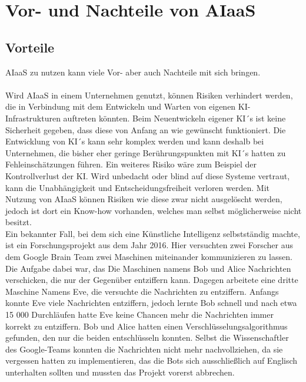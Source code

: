 \section{Vor- und Nachteile von AIaaS}
\subsection{Vorteile}
AIaaS zu nutzen kann viele Vor- aber auch Nachteile mit sich bringen. \\ \\
Wird AIaaS in einem Unternehmen genutzt, können Risiken verhindert werden, die in Verbindung mit dem Entwickeln und Warten von eigenen KI-Infrastrukturen auftreten könnten. Beim Neuentwickeln eigener KI´s ist keine Sicherheit gegeben, dass diese von Anfang an wie gewünscht funktioniert. Die Entwicklung von KI´s kann sehr komplex werden und kann deshalb bei Unternehmen, die bisher eher geringe Berührungspunkten mit KI´s hatten zu Fehleinschätzungen führen. Ein weiteres Risiko wäre zum Beispiel der Kontrollverlust der KI. Wird unbedacht oder blind auf diese Systeme vertraut, kann die Unabhängigkeit und Entscheidungsfreiheit verloren werden. Mit Nutzung von AIaaS können Risiken wie diese zwar nicht ausgelöscht werden, jedoch ist dort ein Know-how vorhanden, welches man selbst möglicherweise nicht besitzt. \\
Ein bekannter Fall, bei dem sich eine Künstliche Intelligenz selbstständig machte, ist ein Forschungsprojekt aus dem Jahr 2016. Hier versuchten zwei Forscher aus dem Google Brain Team zwei Maschinen miteinander kommunizieren zu lassen. Die Aufgabe dabei war, das Die Maschinen namens Bob und Alice Nachrichten verschicken, die nur der Gegenüber entziffern kann. Dagegen arbeitete eine dritte Maschine Namens Eve, die versuchte die Nachrichten zu entziffern. Anfangs konnte Eve viele Nachrichten entziffern, jedoch lernte Bob schnell und nach etwa 15 000 Durchläufen hatte Eve keine Chancen mehr die Nachrichten immer korrekt zu entziffern. Bob und Alice hatten einen Verschlüsselungsalgorithmus gefunden, den nur die beiden entschlüsseln konnten. Selbst die Wissenschaftler des Google-Teams konnten die Nachrichten nicht mehr nachvollziehen, da sie vergessen hatten zu implementieren, das die Bots sich ausschließlich auf Englisch unterhalten sollten und mussten das Projekt vorerst abbrechen. \cite[vgl.][]{Zeit.2016} \cite[vgl.][]{giga.2017} \\ \\
